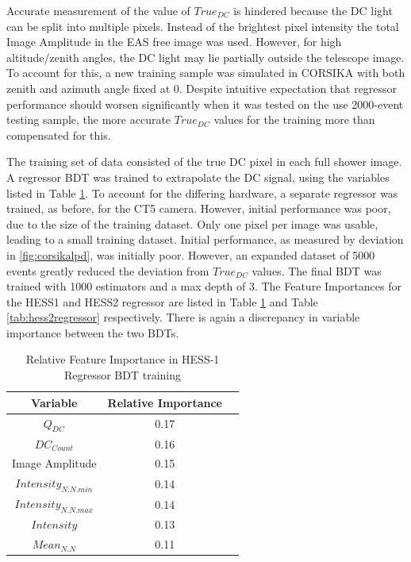\documentclass{article}
\begin{document}
Accurate measurement of the value of $True_{DC}$ is hindered because the DC light can be split into multiple pixels. Instead of the brightest pixel intensity the total Image Amplitude in the EAS free image was used. However, for high altitude/zenith angles, the DC light may lie partially outside the telescope image. To account for this, a new training sample was simulated in CORSIKA with both zenith and azimuth angle fixed at 0. Despite intuitive expectation that regressor performance should worsen significantly when it was tested on the use 2000-event testing sample, the more accurate $True_{DC}$ values for the training more than compensated for this. 

The training set of data consisted of the true DC pixel in each full shower image. A regressor BDT was trained to extrapolate the DC signal, using the variables listed in Table \ref{tab:hess1regressor}. To account for the differing hardware, a separate regressor was trained, as before, for the CT5 camera. However, initial performance was poor, due to the size of the training dataset. Only one pixel per image was usable, leading to a small training dataset. Initial performance, as measured by deviation in \ref{fig:corsikalpd}, was initially poor. However, an expanded dataset of 5000 events greatly reduced the deviation from $True_{DC}$ values. The final BDT was trained with 1000 estimators and a max depth of 3. The Feature Importances for the HESS1 and HESS2 regressor are listed in Table \ref{tab:hess1regressor} and Table \ref{tab:hess2regressor} respectively. There is again a discrepancy in variable importance between the two BDTs.

\begin{table}[h!]
  \centering
  \caption{Relative Feature Importance in HESS-1 Regressor BDT training}
  \label{tab:hess1regressor}
  \begin{tabular}{ccc}
    \toprule
    Variable & Relative Importance\\
    \midrule
    $Q_{DC}$ & 0.17\\
    $DC_{Count}$ & 0.16\\
    Image Amplitude & 0.15\\
    $Intensity_{N.N.min}$ & 0.14\\
    $Intensity_{N.N.max}$ & 0.14\\
    $Intensity$ & 0.13\\
    $Mean_{N.N}$ & 0.11\\
    \bottomrule
  \end{tabular}
\end{table}
\end{document}

